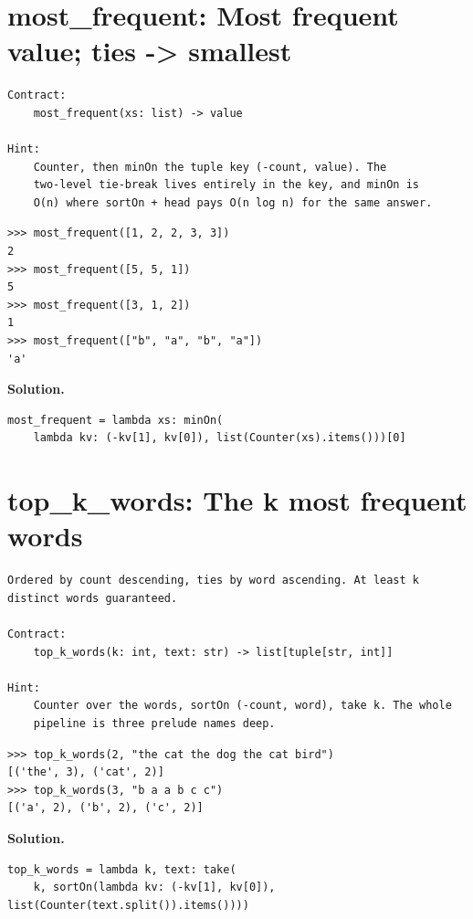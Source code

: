 \documentclass[10pt,letterpaper]{book}
\begin{document}
\section{most\_frequent: Most frequent value; ties -> smallest}
\begin{lstlisting}[style=ex]
Contract:
    most_frequent(xs: list) -> value

Hint:
    Counter, then minOn the tuple key (-count, value). The
    two-level tie-break lives entirely in the key, and minOn is
    O(n) where sortOn + head pays O(n log n) for the same answer.
\end{lstlisting}
\begin{lstlisting}[style=ex]
>>> most_frequent([1, 2, 2, 3, 3])
2
>>> most_frequent([5, 5, 1])
5
>>> most_frequent([3, 1, 2])
1
>>> most_frequent(["b", "a", "b", "a"])
'a'
\end{lstlisting}
\noindent\textbf{Solution.}
\begin{lstlisting}[style=code]
most_frequent = lambda xs: minOn(
    lambda kv: (-kv[1], kv[0]), list(Counter(xs).items()))[0]
\end{lstlisting}

\section{top\_k\_words: The k most frequent words}
\begin{lstlisting}[style=ex]
Ordered by count descending, ties by word ascending. At least k
distinct words guaranteed.

Contract:
    top_k_words(k: int, text: str) -> list[tuple[str, int]]

Hint:
    Counter over the words, sortOn (-count, word), take k. The whole
    pipeline is three prelude names deep.
\end{lstlisting}
\begin{lstlisting}[style=ex]
>>> top_k_words(2, "the cat the dog the cat bird")
[('the', 3), ('cat', 2)]
>>> top_k_words(3, "b a a b c c")
[('a', 2), ('b', 2), ('c', 2)]
\end{lstlisting}
\noindent\textbf{Solution.}
\begin{lstlisting}[style=code]
top_k_words = lambda k, text: take(
    k, sortOn(lambda kv: (-kv[1], kv[0]), list(Counter(text.split()).items())))
\end{lstlisting}
\end{document}
